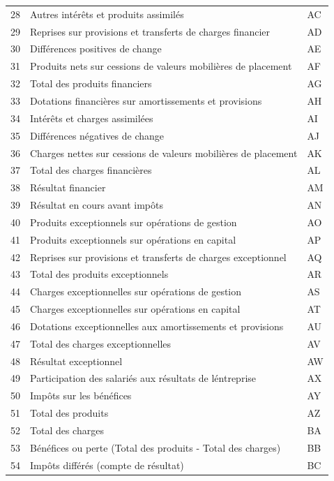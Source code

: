 \documentclass[mstat,12pt]{unswthesis}
\begin{document}
\begin{longtable}{|p{0.7cm}|p{12cm}|p{1.5cm}|}
28 & Autres int\'er\^ets et produits assimil\'es & AC \\
29 & Reprises sur provisions et transferts de charges financier & AD \\
30 & Diff\'erences positives de change & AE \\
31 & Produits nets sur cessions de valeurs mobili\`eres de placement & AF \\
32 & Total des produits financiers & AG \\
33 & Dotations financi\`eres sur amortissements et provisions & AH \\
34 & Int\'er\^ets et charges assimil\'ees & AI \\
35 & Diff\'erences n\'egatives de change & AJ \\
36 & Charges nettes sur cessions de valeurs mobili\`eres de placement & AK \\
37 & Total des charges financi\`eres & AL \\
38 & R\'esultat financier & AM \\
39 & R\'esultat en cours avant imp\^ots & AN \\
40 & Produits exceptionnels sur op\'erations de gestion & AO \\
41 & Produits exceptionnels sur op\'erations en capital & AP \\
42 & Reprises sur provisions et transferts de charges exceptionnel & AQ \\
43 & Total des produits exceptionnels & AR \\
44 & Charges exceptionnelles sur op\'erations de gestion & AS \\
45 & Charges exceptionnelles sur op\'erations en capital & AT \\
46 & Dotations exceptionnelles aux amortissements et provisions & AU \\
47 & Total des charges exceptionnelles & AV \\
48 & R\'esultat exceptionnel & AW \\
49 & Participation des salari\'es aux r\'esultats de l\'entreprise & AX \\
50 & Imp\^ots sur les b\'en\'efices & AY \\
51 & Total des produits & AZ \\
52 & Total des charges & BA \\
53 & B\'en\'efices ou perte (Total des produits - Total des charges) & BB \\
54 & Imp\^ots diff\'er\'es (compte de r\'esultat) & BC \\

\end{longtable}
\end{document}

